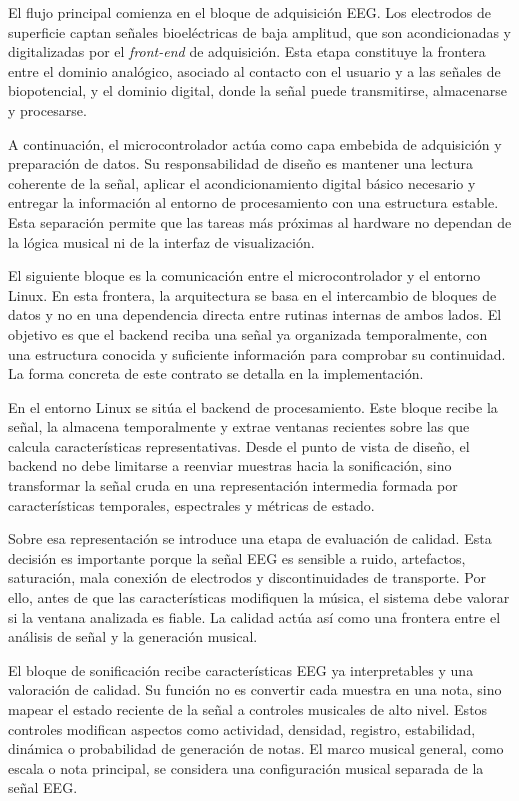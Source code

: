 \documentclass[../main.tex]{subfiles}
\begin{document}
El flujo principal comienza en el bloque de adquisición EEG. Los electrodos de superficie captan señales bioeléctricas de baja amplitud, que son acondicionadas y digitalizadas por el \textit{front-end} de adquisición. Esta etapa constituye la frontera entre el dominio analógico, asociado al contacto con el usuario y a las señales de biopotencial, y el dominio digital, donde la señal puede transmitirse, almacenarse y procesarse.

A continuación, el microcontrolador actúa como capa embebida de adquisición y preparación de datos. Su responsabilidad de diseño es mantener una lectura coherente de la señal, aplicar el acondicionamiento digital básico necesario y entregar la información al entorno de procesamiento con una estructura estable. Esta separación permite que las tareas más próximas al hardware no dependan de la lógica musical ni de la interfaz de visualización.

El siguiente bloque es la comunicación entre el microcontrolador y el entorno Linux. En esta frontera, la arquitectura se basa en el intercambio de bloques de datos y no en una dependencia directa entre rutinas internas de ambos lados. El objetivo es que el backend reciba una señal ya organizada temporalmente, con una estructura conocida y suficiente información para comprobar su continuidad. La forma concreta de este contrato se detalla en la implementación.

En el entorno Linux se sitúa el backend de procesamiento. Este bloque recibe la señal, la almacena temporalmente y extrae ventanas recientes sobre las que calcula características representativas. Desde el punto de vista de diseño, el backend no debe limitarse a reenviar muestras hacia la sonificación, sino transformar la señal cruda en una representación intermedia formada por características temporales, espectrales y métricas de estado.

Sobre esa representación se introduce una etapa de evaluación de calidad. Esta decisión es importante porque la señal EEG es sensible a ruido, artefactos, saturación, mala conexión de electrodos y discontinuidades de transporte. Por ello, antes de que las características modifiquen la música, el sistema debe valorar si la ventana analizada es fiable. La calidad actúa así como una frontera entre el análisis de señal y la generación musical.

El bloque de sonificación recibe características EEG ya interpretables y una valoración de calidad. Su función no es convertir cada muestra en una nota, sino mapear el estado reciente de la señal a controles musicales de alto nivel. Estos controles modifican aspectos como actividad, densidad, registro, estabilidad, dinámica o probabilidad de generación de notas. El marco musical general, como escala o nota principal, se considera una configuración musical separada de la señal EEG.
\end{document}
